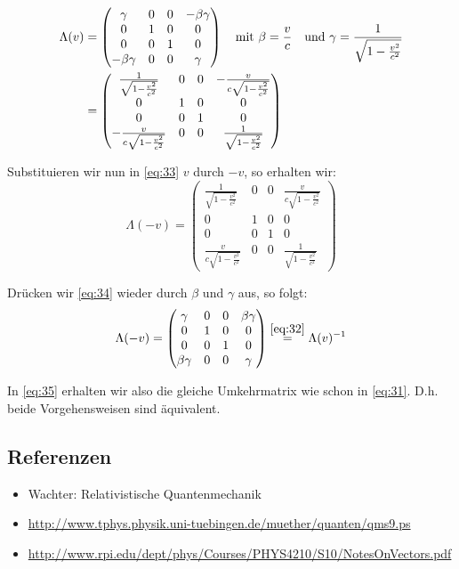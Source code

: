 \begin{align}
  \label{eq:33}
   \Lambda(v) &=
  \begin{pmatrix}
    \gamma&0&0&-\beta\gamma\\
    0&1&0&0\\
    0&0&1&0\\
    -\beta\gamma&0&0&\gamma
  \end{pmatrix}
  \quad\text{mit }
  \beta = \frac{v}{c}\quad\text{und }
  \gamma = \frac{1}{\sqrt{1-\frac{v^2}{c^2}}}\notag\\
   &=
  \begin{pmatrix}
    \frac{1}{\sqrt{1-\frac{v^2}{c^2}}}&0&0&-\frac{v}{c\sqrt{1-\frac{v^2}{c^2}}}\\
    0&1&0&0\\
    0&0&1&0\\
    -\frac{v}{c\sqrt{1-\frac{v^2}{c^2}}}&0&0&\frac{1}{\sqrt{1-\frac{v^2}{c^2}}}
  \end{pmatrix}
\end{align}

Substituieren wir nun in \eqref{eq:33} \(v\) durch \(-v\), so erhalten wir:
\begin{equation}
  \label{eq:34}
  \Lambda(-v)=
   \begin{pmatrix}
    \frac{1}{\sqrt{1-\frac{v^2}{c^2}}}&0&0&\frac{v}{c\sqrt{1-\frac{v^2}{c^2}}}\\
    0&1&0&0\\
    0&0&1&0\\
    \frac{v}{c\sqrt{1-\frac{v^2}{c^2}}}&0&0&\frac{1}{\sqrt{1-\frac{v^2}{c^2}}}
  \end{pmatrix}
\end{equation}

Drücken wir \eqref{eq:34} wieder durch \(\beta\) und \(\gamma\) aus, so folgt:
\begin{equation}
  \label{eq:35} 
   \Lambda(-v)=
  \begin{pmatrix}
    \gamma&0&0&\beta\gamma\\
    0&1&0&0\\
    0&0&1&0\\
    \beta\gamma&0&0&\gamma
  \end{pmatrix}\stackrel{\eqref{eq:32}}=\Lambda(v)^{-1}
\end{equation}

In \eqref{eq:35} erhalten wir also die gleiche Umkehrmatrix wie schon in
\eqref{eq:31}. D.h. beide Vorgehensweisen sind äquivalent.


\subsection*{Referenzen}
\begin{itemize}
\item Wachter: Relativistische Quantenmechanik
\item \url{http://www.tphys.physik.uni-tuebingen.de/muether/quanten/qms9.ps}
\item \url{http://www.rpi.edu/dept/phys/Courses/PHYS4210/S10/NotesOnVectors.pdf}
\end{itemize}


